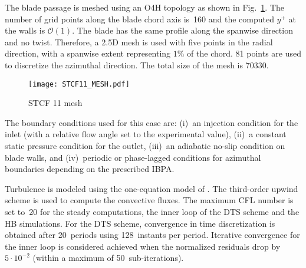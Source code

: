 
The blade passage is meshed using an O4H 
topology as shown in Fig.~\ref{fig:stcf11_mesh}.
The number of grid points along the blade
chord axis is~160 and the computed $y^+$ at the walls is $\mathcal{O}(1)$.
The blade has the same profile along the spanwise direction and no
twist. Therefore, a 2.5D mesh is used with five points 
in the radial direction, with a spanwise
extent representing $1\%$ of the chord. 
81 points are used to discretize the azimuthal direction.
The total size of the mesh is 70330.
\begin{figure}[htb]
  \centering
  \texttt{[image: STCF11\_MESH.pdf]}
  \caption{STCF 11 mesh}
  \label{fig:stcf11_mesh}
\end{figure}

The boundary conditions used for this case are: (i)~an
injection condition  for the inlet (with a relative flow angle
set to the  experimental value), (ii)~a constant static pressure
condition for the outlet,  (iii)~an adiabatic no-slip condition on
blade walls, and (iv)~periodic or phase-lagged conditions 
for azimuthal boundaries depending on the  
prescribed IBPA.

Turbulence is modeled using the one-equation model of
\citet{Spalart1992}.  The third-order upwind \citet{Roe1981}
scheme is used to compute the convective fluxes.
The maximum
CFL number is set to~20 for the steady computations,  the inner loop
of the DTS scheme and the HB simulations.  For the DTS scheme,  
convergence in time discretization is obtained
after 20~periods using 128~instants per period.  Iterative convergence 
for the inner loop is considered achieved when the normalized
residuals drop by $5\cdot 10^{-2}$ (within a maximum of
50~sub-iterations).

